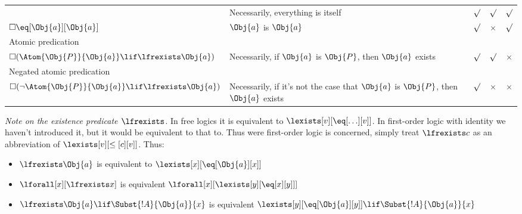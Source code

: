 \documentclass[../../../include/open-logic-section]{subfiles}
\begin{document}
\begin{center}
\begin{tabular}[t]{p{}p{}ccc}
        & Necessarily, everything is itself
        & $\surd$ & $\surd$ & $\surd$ \\
    $\Box\eq[\Obj{a}][\Obj{a}]$
        & $\Obj{a}$ is $\Obj{a}$
        & $\surd$ & $\times$ & $\surd$ \\
    \multicolumn{2}{l}{Atomic predication} \\
    $\Box(\Atom{\Obj{P}}{\Obj{a}}\lif\lfrexists\Obj{a})$ 
        & Necessarily, if $\Obj{a}$ is $\Obj{P}$, then $\Obj{a}$ exists 
        & $\surd$ & $\surd$ & $\times$ \\
    \multicolumn{2}{l}{Negated atomic predication} \\
    $\Box(\lnot \Atom{\Obj{P}}{\Obj{a}}\lif\lfrexists\Obj{a})$ 
        & Necessarily, if it's not the case that $\Obj{a}$ is $\Obj{P}$, then $\Obj{a}$ exists 
        & $\surd$ & $\times$ & $\times$ \\
    \hline
\end{tabular}
\smallskip
\end{center}

\emph{Note on the existence predicate $\lfrexists$}. In free logics
it is equivalent to $\lexists[v][\eq[\ldots][v]]$. In first-order
logic with identity we haven't introduced it, but it would be
equivalent to that to. Thus were first-order logic is concerned,
simply treat $\lfrexists c$ as an abbreviation of
 $\lexists[v][\leq[c][v]]$.
Thus:
\begin{itemize}
    \item $\lfrexists \Obj{a}$ is 
    equivalent to $\lexists[x][\eq[\Obj{a}][x]]$
    \item $\lforall[x][\lfrexists x]$ is 
    equivalent $\lforall[x][\lexists[y][\eq[x][y]]]$
    \item $\lfrexists\Obj{a}\lif\Subst{!A}{\Obj{a}}{x}$ is 
    equivalent $\lexists[y][\eq[\Obj{a}][y]]\lif\Subst{!A}{\Obj{a}}{x}$
\end{itemize}
\end{document}
